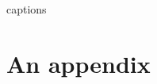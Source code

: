 \documentclass[
  digital, %
  table,   %
  nolof,     %
  nolot,     %
           oneside
]{fithesis3}
\begin{document}
{\csname captions\languagename\endcsname %
\makeatletter %
  \thesis@selectLocale{\thesis@locale}\makeatother
\printbibliography[heading=bibintoc]} %

\appendix %
\chapter{An appendix}
\end{document}
